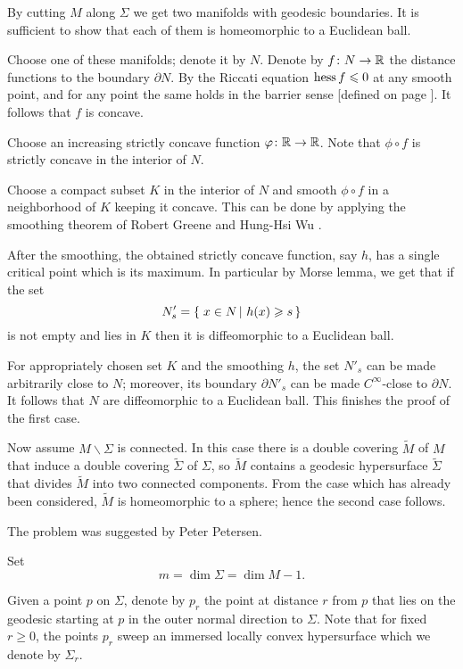 By cutting $M$ along $\Sigma$ 
we get two manifolds
with geodesic boundaries.
It is sufficient to show that each of them is homeomorphic to a Euclidean ball.

Choose one of these manifolds; denote it by $N$.
Denote by $f\:N\z\to\RR$ the distance functions to the boundary $\partial N$.
By the Riccati equation $\operatorname{\rm hess}\nolimits f\leqslant 0$ at any smooth point,
and for any point the same holds in the barrier sense [defined on page \pageref{page:barrier sense}].
It follows that $f$ is concave.

Choose an increasing strictly concave function $\varphi\colon\mathbb{R}\to\mathbb{R}$.
Note that $\phi\circ f$ is strictly concave in the interior of $N$.

Choose a compact subset $K$ in the interior of $N$ and
smooth $\phi\circ f$ in a neighborhood of $K$ keeping it concave. 
This can be done by applying the smoothing theorem of Robert Greene and Hung-Hsi Wu \cite[Theorem~2]{greene-wu}.

After the smoothing, the obtained strictly concave function, say $h$, has a single critical point which is its maximum.
In particular by Morse lemma, we get that if the set  
\[N'_s=\set{x\in N}{h(x)\ge s}\]
is not empty and lies in $K$ then it is diffeomorphic to a Euclidean ball.

For appropriately chosen set $K$ and the smoothing $h$, the set $N'_s$ can be made arbitrarily close to $N$;
moreover, its boundary $\partial N'_s$ can be made $C^\infty$-close to $\partial N$.
It follows that $N$ are diffeomorphic to a Euclidean ball.
This finishes the proof of the first case.

Now assume $M\backslash\Sigma$ is connected.
In this case there is a double covering $\tilde M$ of $M$ that induce a double covering $\tilde\Sigma$ of $\Sigma$,
so $\tilde M$ contains a geodesic hypersurface $\tilde\Sigma$ that divides $\tilde M$ into two connected components. 
From the case which has already been considered, $\tilde M$ is homeomorphic to a sphere;
hence the second case follows.
\qeds

The problem was suggested by Peter Petersen.



Set 
\[m=\dim \Sigma=\dim M-1.\]

Given a point $p$ on $\Sigma$, denote by $p_r$ the point at distance $r$ from $p$
that lies on the geodesic starting at $p$ in the outer normal direction to $\Sigma$.
Note that for fixed $r\ge 0$,
the points $p_r$ sweep an immersed locally convex hypersurface which we denote by $\Sigma_r$.


